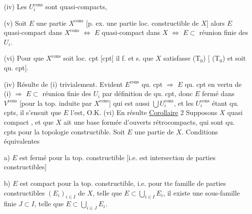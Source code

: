 
(iv) Les $U_i^{\mathrm{cons}}$ sont quasi-compacts, 

(v) Soit $E$ une partie   $X^{\mathrm{cons}}$ [p. ex. une partie loc. constructible \deleted{\unsure{]}} de $X$] alors $E$  quasi-compact  dans $X^{\mathrm{cons}}$ $\Longleftrightarrow$ $E$ quasi-compact dans $X$ $\Longleftrightarrow$ $E\subset$ réunion finie des $U_i$.

(vi) Pour que $X^{\mathrm{cons}}$ soit loc. cpt [cpt] il f. et s. que $X$ satisfasse (T$_0$) [ (T$_0$) et soit qu. cpt].

(iv) Résulte de (i) trivialement. Evident $E^{\mathrm{cons}}$ qu. cpt $\Rightarrow$ $E$ qu. cpt en vertu de (i) $\Rightarrow$ $E\subset$ réunion finie  des $U_i$ par définition de qu. cpt, donc $E$ fermé dans $V^{\mathrm{cons}}$ [pour la top. induite par $X^{\mathrm{cons}}$] qui est aussi $\bigcup U_i^{\mathrm{cons}}$, et les $U_i^{\mathrm{cons}}$ étant qu. cpts, il s'ensuit que $E$ l'est, O.K. \quad (vi) En résulte 
\uline{Corollaire} 2  Supposons $X$  quasi compact , et que  $X$ ait une base formée d'ouverts  rétrocompacts, qui sont qu. cpts pour la topologie constructible. Soit $E$ une partie de $X$. Conditions équivalentes

a) $E$ est fermé pour la top. constructible [i.e. est intersection  de parties constructibles]

b) $E$ est compact pour la top. constructible, i.e. pour tte famille de parties constructibles $(E_i)_{i\in I}$ de $X$, telle que $E\subset\bigcup_{i\in I}E_i$, il existe une sous-famille finie $J\subset I$, telle que $E\subset\bigcup_{i\in J}E_i$.


